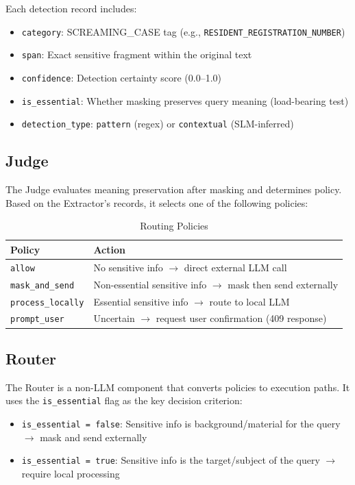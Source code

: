 \documentclass[11pt,a4paper]{article}
\begin{document}
Each detection record includes:

\begin{itemize}[nosep]
  \item \texttt{category}: SCREAMING\_CASE tag (e.g., \texttt{RESIDENT\_REGISTRATION\_NUMBER})
  \item \texttt{span}: Exact sensitive fragment within the original text
  \item \texttt{confidence}: Detection certainty score (0.0--1.0)
  \item \texttt{is\_essential}: Whether masking preserves query meaning (load-bearing test)
  \item \texttt{detection\_type}: \texttt{pattern} (regex) or \texttt{contextual} (SLM-inferred)
\end{itemize}

\subsection{Judge}

The Judge evaluates meaning preservation after masking and determines policy. Based on the Extractor's records, it selects one of the following policies:

\begin{table}[h]
\centering
\begin{tabular}{@{}ll@{}}
\toprule
Policy & Action \\
\midrule
\texttt{allow} & No sensitive info $\rightarrow$ direct external LLM call \\
\texttt{mask\_and\_send} & Non-essential sensitive info $\rightarrow$ mask then send externally \\
\texttt{process\_locally} & Essential sensitive info $\rightarrow$ route to local LLM \\
\texttt{prompt\_user} & Uncertain $\rightarrow$ request user confirmation (409 response) \\
\bottomrule
\end{tabular}
\caption{Routing Policies}
\end{table}

\subsection{Router}

The Router is a non-LLM component that converts policies to execution paths. It uses the \texttt{is\_essential} flag as the key decision criterion:

\begin{itemize}[nosep]
  \item \texttt{is\_essential = false}: Sensitive info is background/material for the query $\rightarrow$ mask and send externally
  \item \texttt{is\_essential = true}: Sensitive info is the target/subject of the query $\rightarrow$ require local processing
\end{itemize}
\end{document}
